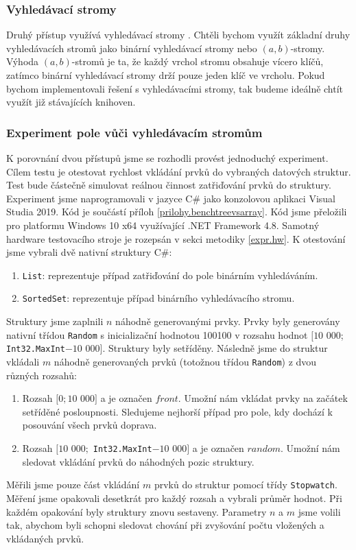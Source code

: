 \subsubsection{Vyhledávací stromy}

Druhý přístup využívá vyhledávací stromy \citep[str. 177]{labyrint}.
Chtěli bychom využít základní druhy vyhledávacích stromů jako binární vyhledávací stromy nebo $(a, b)$-stromy.
Výhoda $(a, b)$-stromů je ta, že každý vrchol stromu obsahuje vícero klíčů, zatímco binární vyhledávací stromy drží pouze jeden klíč ve vrcholu.
Pokud bychom implementovali řešení s vyhledávacími stromy, tak budeme ideálně chtít využít již stávajících knihoven.

\subsubsection{Experiment pole vůči vyhledávacím stromům}

K porovnání dvou přístupů jsme se rozhodli provést jednoduchý experiment.
Cílem testu je otestovat rychlost vkládání prvků do vybraných datových struktur.
Test bude částečně simulovat reálnou činnost zatřiďování prvků do struktury.
Experiment jsme naprogramovali v jazyce C\# jako konzolovou aplikaci Visual Studia 2019.
Kód je součástí příloh \ref{prilohy.benchtreevsarray}.
Kód jsme přeložili pro platformu Windows 10 x64 využívající .NET Framework 4.8.
Samotný hardware testovacího stroje je rozepsán v sekci metodiky \ref{expr.hw}.
K otestování jsme vybrali dvě nativní struktury C\#:

\begin{enumerate}
\item \texttt{List}: reprezentuje případ zatřiďování do pole binárním vyhledáváním.
\item \texttt{SortedSet}: reprezentuje případ binárního vyhledávacího stromu.
\end{enumerate}
Struktury jsme zaplnili $n$ náhodně generovanými prvky.
Prvky byly generovány nativní třídou \texttt{Random} s inicializační hodnotou 100100 v rozsahu hodnot $[10$ 000; \texttt{Int32.MaxInt}$ - 10$ $000]$.
Struktury byly setříděny.
Následně jsme do struktur vkládali $m$ náhodně generovaných prvků (totožnou třídou \texttt{Random}) z dvou různých rozsahů:

\begin{enumerate}
\item Rozsah $[0; 10$ $000]$ a je označen $front$. 
Umožní nám vkládat prvky na začátek setříděné posloupnosti. 
Sledujeme nejhorší případ pro pole, kdy dochází k posouvání všech prvků doprava.
\item Rozsah $[10$ $000;$ \texttt{Int32.MaxInt}$ - 10$ $000]$ a je označen $random$.
Umožní nám sledovat vkládání prvků do náhodných pozic struktury.
\end{enumerate}
Měřili jsme pouze část vkládání $m$ prvků do struktur pomocí třídy \texttt{Stopwatch}.
Měření jsme opakovali desetkrát pro každý rozsah a vybrali průměr hodnot.
Při každém opakování byly struktury znovu sestaveny.
Parametry $n$ a $m$ jsme volili tak, abychom byli schopni sledovat chování při zvyšování počtu vložených a vkládaných prvků. 


